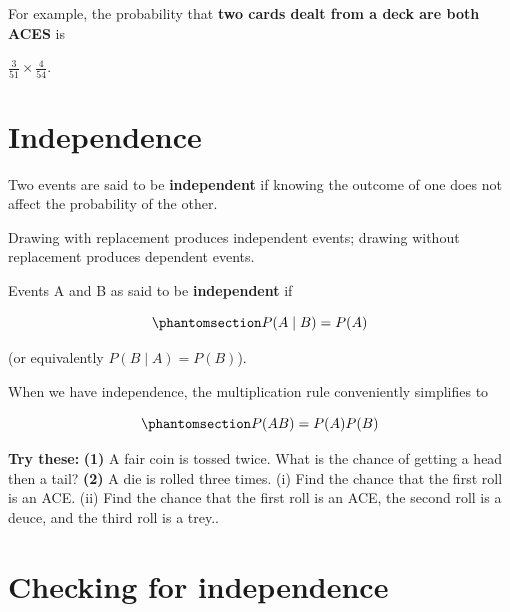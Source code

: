 \documentclass[
  letterpaper,
  DIV=11,
  numbers=noendperiod]{scrreprt}
\begin{document}
For example, the probability that \textbf{two cards dealt from a deck
are both ACES} is

\(\displaystyle \frac{3}{51} \times \frac{4}{54}\).

\section{Independence}\label{independence}

Two events are said to be \textbf{independent} if knowing the outcome of
one does not affect the probability of the other.

Drawing with replacement produces independent events; drawing without
replacement produces dependent events.

\begin{tcolorbox}[enhanced jigsaw, coltitle=black, colbacktitle=quarto-callout-important-color!10!white, left=2mm, bottomrule=.15mm, bottomtitle=1mm, colback=white, titlerule=0mm, colframe=quarto-callout-important-color-frame, breakable, leftrule=.75mm, toptitle=1mm, opacitybacktitle=0.6, rightrule=.15mm, title=\textcolor{quarto-callout-important-color}{\faExclamation}\hspace{0.5em}{Independence}, arc=.35mm, opacityback=0, toprule=.15mm]

Events A and B as said to be \textbf{independent} if

\begin{equation}\phantomsection\label{eq-independent}{
P(A \mid B) = P(A)
}\end{equation}

(or equivalently \(P(B \mid A) = P(B)\)).

\end{tcolorbox}

When we have independence, the multiplication rule conveniently
simplifies to

\begin{equation}\phantomsection\label{eq-multiplication-rule-independent}{
P(AB) = P(A)P(B)
}\end{equation}

\textbf{Try these:} \textbf{(1)} A fair coin is tossed twice. What is
the chance of getting a head then a tail? \textbf{(2)} A die is rolled
three times. (i) Find the chance that the first roll is an ACE. (ii)
Find the chance that the first roll is an ACE, the second roll is a
deuce, and the third roll is a trey..

\section{Checking for independence}\label{checking-for-independence}
\end{document}
